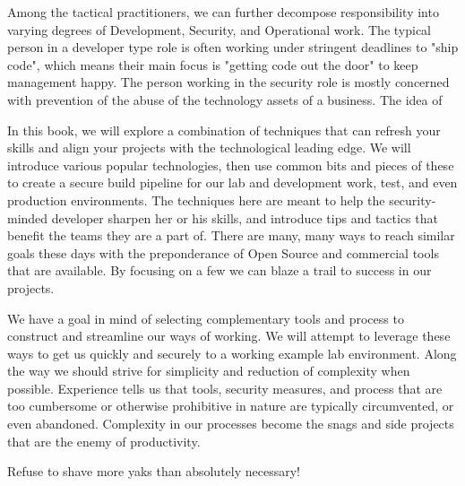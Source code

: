 \justify
Among the tactical practitioners, we can further decompose responsibility into
varying degrees of Development, Security, and Operational work. The typical 
person in a developer type role
is often working under stringent deadlines to "ship code", which means their 
main focus is "getting code out the door" to keep management happy. The person
working in the security role is mostly concerned with prevention of the abuse 
of the technology assets of a business. The idea of 

\justify
In this book, we will explore a combination of techniques that can refresh your
skills and align your projects with the technological leading edge. We will
introduce various popular technologies, then use common bits and pieces of
these to create a secure build pipeline for our lab and development work,
test, and even production environments. The techniques here are meant to help
the security-minded developer sharpen her or his skills, and introduce tips
and tactics that benefit the teams they are a part of. There are many, many
ways to reach similar goals these days with the preponderance of Open Source
and commercial tools that are available. By focusing on a few we can blaze a
trail to success in our projects.

\justify
We have a goal in mind of selecting complementary tools and process to construct
and streamline our ways of working. We will attempt to leverage these ways to
get us quickly and securely to a working example lab environment. Along the
way we should strive for simplicity and reduction of complexity when possible.
Experience tells us that tools, security measures, and process that are too cumbersome
or otherwise prohibitive in nature are typically circumvented, or even abandoned. 
Complexity in our processes become the snags and side projects that are the
enemy of productivity.

\justify
Refuse to shave more yaks than absolutely necessary!
